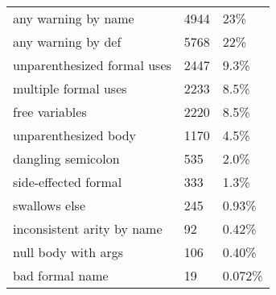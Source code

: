 \begin{tabular}{|l|l|l|} \hline
any warning by name & 4944 & 23\% \\ 
any warning by def & 5768 & 22\% \\ 
unparenthesized formal uses & 2447 & 9.3\% \\ 
multiple formal uses & 2233 & 8.5\% \\ 
free variables & 2220 & 8.5\% \\ 
unparenthesized body & 1170 & 4.5\% \\ 
dangling semicolon & 535 & 2.0\% \\ 
side-effected formal & 333 & 1.3\% \\ 
swallows else & 245 & 0.93\% \\ 
inconsistent arity by name & 92 & 0.42\% \\ 
null body with args & 106 & 0.40\% \\ 
bad formal name & 19 & 0.072\% \\ 
\hline
\end{tabular}
